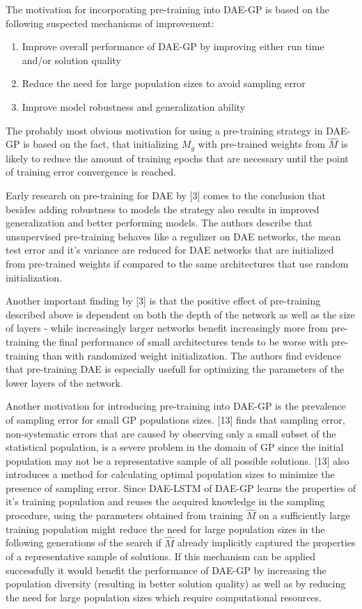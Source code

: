 \documentclass[
  11pt,
]{article}
\providecommand{\tightlist}{%
  \setlength{\itemsep}{0pt}\setlength{\parskip}{0pt}}
\begin{document}
The motivation for incorporating pre-training into DAE-GP is based on the following suspected mechanisms of improvement:

\begin{enumerate}
\def\labelenumi{\arabic{enumi}.}
\tightlist
\item
  Improve overall performance of DAE-GP by improving either run time and/or solution quality
\item
  Reduce the need for large population sizes to avoid sampling error
\item
  Improve model robustness and generalization ability
\end{enumerate}

The probably most obvious motivation for using a pre-training strategy in DAE-GP is based on the fact, that initializing \(M_g\) with pre-trained weights from \(\hat{M}\) is likely to reduce the amount of training epochs that are necessary until the point of training error convergence is reached.

Early research on pre-training for DAE by {[}3{]} comes to the conclusion that besides adding robustness to models the strategy also results in improved generalization and better performing models. The authors describe that unsupervised pre-training behaves like a regulizer on DAE networks, the mean test error and it's variance are reduced for DAE networks that are initialized from pre-trained weights if compared to the same architectures that use random initialization.

Another important finding by {[}3{]} is that the positive effect of pre-training described above is dependent on both the depth of the network as well as the size of layers - while increasingly larger networks benefit increasingly more from pre-training the final performance of small architectures tends to be worse with pre-training than with randomized weight initialization. The authors find evidence that pre-training DAE is especially usefull for optimizing the parameters of the lower layers of the network.

Another motivation for introducing pre-training into DAE-GP is the prevalence of sampling error for small GP populations sizes.
{[}13{]} finds that sampling error, non-systematic errors that are caused by observing only a small subset of the statistical population, is a severe problem in the domain of GP since the initial population may not be a representative sample of all possible solutions.
{[}13{]} also introduces a method for calculating optimal population sizes to minimize the presence of sampling error.
Since DAE-LSTM of DAE-GP learns the properties of it's training population and reuses the acquired knowledge in the sampling procedure, using the parameters obtained from training \(\hat{M}\) on a sufficiently large training population might reduce the need for large population sizes in the following generations of the search if \(\hat{M}\) already implicitly captured the properties of a representative sample of solutions.
If this mechanism can be applied successfully it would benefit the performance of DAE-GP by increasing the population diversity (resulting in better solution quality) as well as by reducing the need for large population sizes which require computational resources.
\end{document}
